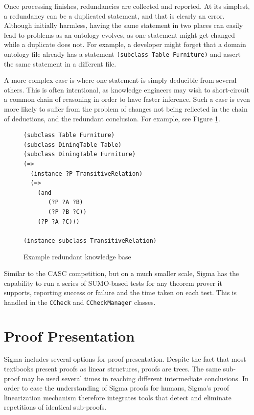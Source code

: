 \documentclass{book}
\begin{document}
Once processing finishes, redundancies are collected and reported.  At its
simplest, a redundancy can be a duplicated statement, and that is clearly an
error. Although initially harmless, having the same statement in two places can
easily lead to problems as an ontology evolves, as one statement might get
changed while a duplicate does not.  For example, a developer might forget that
a domain ontology file already has a statement {\tt (subclass Table Furniture)}
and assert the same statement in a different file.

A more complex case is where one statement is simply deducible from several
others.  This is often intentional, as knowledge engineers may wish to
short-circuit a common chain of reasoning in order to have faster inference.
Such a case is even more likely to suffer from the problem of changes not being
reflected in the chain of deductions, and the redundant conclusion.  For
example, see Figure \ref{fig:RedunKB}.

\begin{figure}
\begin{framed}
\begin{verbatim}
(subclass Table Furniture)
(subclass DiningTable Table)
(subclass DiningTable Furniture)
(=>
  (instance ?P TransitiveRelation)
  (=>
    (and
       (?P ?A ?B)
       (?P ?B ?C))
    (?P ?A ?C)))

(instance subclass TransitiveRelation)
\end{verbatim}
\caption{Example redundant knowledge base}
\label{fig:RedunKB}
\end{framed}
\end{figure}

Similar to the CASC competition, but on a much smaller scale, Sigma
has the capability to run a series of SUMO-based tests for any theorem prover it
supports, reporting success or failure and the time taken on each test.  This is
handled in the \texttt{CCheck} and \texttt{CCheckManager} classes.


\section{Proof Presentation}
\label{chap:SUMOInfe:sec:Proo}

Sigma includes several options for proof presentation. Despite the fact that
most textbooks present proofs as linear structures, proofs are trees. The same
sub-proof may be used several times in reaching different intermediate
conclusions. In order to ease the understanding of Sigma proofs for humans,
Sigma's proof linearization mechanism therefore integrates tools that detect and
eliminate repetitions of identical sub-proofs.
\end{document}
